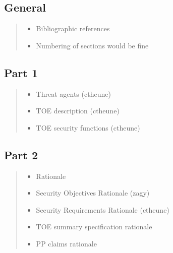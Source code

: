 \documentclass[10pt,a4paper,english]{article}
\begin{document}
\hypertarget{general}{}
\subsection*{General}
\begin{quote}
\begin{itemize}
\item {} 
Bibliographic references

\item {} 
Numbering of sections would be fine

\end{itemize}
\end{quote}



\hypertarget{part-1}{}
\subsection*{Part 1}
\begin{quote}
\begin{itemize}
\item {} 
Threat agents (ctheune)

\item {} 
TOE description (ctheune)

\item {} 
TOE security functions (ctheune)

\end{itemize}
\end{quote}



\hypertarget{part-2}{}
\subsection*{Part 2}
\begin{quote}
\begin{itemize}
\item {} 
Rationale

\item {} 
Security Objectives Rationale (zagy)

\item {} 
Security Requirements Rationale (ctheune)

\item {} 
TOE summary specification rationale

\item {} 
PP claims rationale

\end{itemize}
\end{quote}
\end{document}
